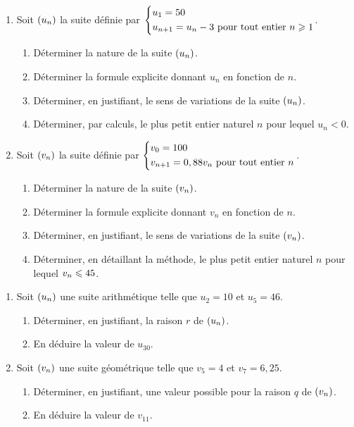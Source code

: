 \documentclass[a4paper,11pt]{article}
\begin{document}
\smallskip


\begin{enumerate}
	\item Soit $\suiten$ la suite définie par $\begin{dcases} u_1 = 50 \\ u_{n+1}=u_n-3 \text{ pour tout entier }n \pg 1 \end{dcases}$.
	\begin{enumerate}
		\item Déterminer la nature de la suite $\suiten$.
		\item Déterminer la formule explicite donnant $u_n$ en fonction de $n$.
		\item Déterminer, en justifiant, le sens de variations de la suite $\suiten$.
		\item Déterminer, par calculs, le plus petit entier naturel $n$ pour lequel $u_n < 0$.
	\end{enumerate}
	\item Soit $\suiten[v]$ la suite définie par $\begin{dcases} v_0 = 100 \\ v_{n+1}=0,88v_n \text{ pour tout entier }n \end{dcases}$.
	\begin{enumerate}
		\item Déterminer la nature de la suite $\suiten[v]$.
		\item Déterminer la formule explicite donnant $v_n$ en fonction de $n$.
		\item Déterminer, en justifiant, le sens de variations de la suite $\suiten[v]$.
		\item Déterminer, en détaillant la méthode, le plus petit entier naturel $n$ pour lequel $v_n \pp 45$.
	\end{enumerate} 
\end{enumerate}

\smallskip


\begin{enumerate}
	\item Soit $\suiten$ une suite arithmétique telle que $u_2=10$ et $u_5=46$.
	\begin{enumerate}
		\item Déterminer, en justifiant, la raison $r$ de $\suiten$.
		\item En déduire la valeur de $u_{30}$.
	\end{enumerate}
	\item Soit $\suiten[v]$ une suite géométrique telle que $v_5 = 4$ et $v_7=6,25$.
	\begin{enumerate}
		\item Déterminer, en justifiant, une valeur possible pour la raison $q$ de $\suiten[v]$.
		\item En déduire la valeur de $v_{11}$.
	\end{enumerate}
\end{enumerate}
\end{document}
